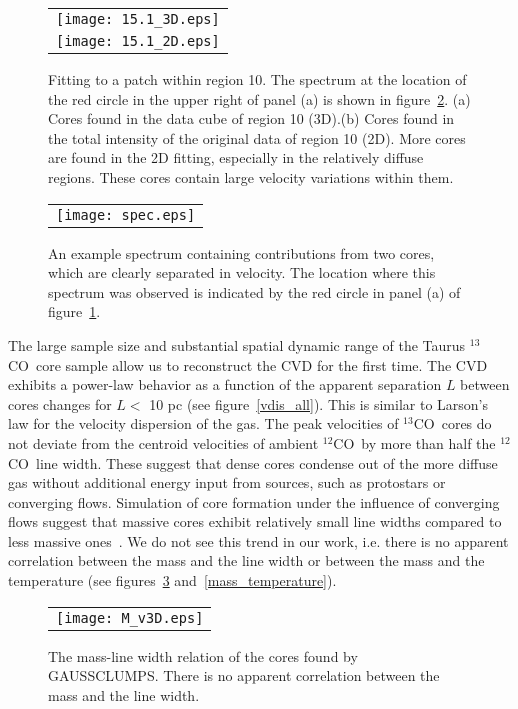 \documentclass[12pt,preprint]{aastex}
\def\co{$^{12}$CO}
\def\13co{$^{13}$CO}
\begin{document}
\begin{figure}
\begin{tabular}{c}
\texttt{[image: 15.1\_3D.eps]}\\
\texttt{[image: 15.1\_2D.eps]}\\
\end{tabular}
\caption{Fitting to a patch within region 10. The spectrum at the location of the red circle in the upper right of panel (a) is shown in figure~\ref{overlap}. (a) Cores found in the data cube of region 10 (3D).(b) Cores found in the total intensity of the original data of region 10 (2D).
More cores are found in the 2D fitting, especially in the relatively diffuse regions. These cores contain large velocity variations within them. \label{region10}}
\end{figure}

\begin{figure}
\begin{tabular}{c}
\texttt{[image: spec.eps]}\\
\end{tabular}
\caption{An example spectrum containing contributions from two cores, which are clearly separated in velocity. The location where this spectrum was observed is indicated by the red circle in panel (a) of figure~\ref{region10}. \label{overlap}}
\end{figure}

The large sample size and substantial spatial dynamic range of the Taurus \13co\ core sample allow us
to reconstruct the CVD for the first time. The CVD exhibits a power-law behavior as a function of the apparent separation $L$  between cores changes for $L<$ 10 pc (see figure~\ref{vdis_all}). This is similar to Larson's law for the velocity dispersion of the gas. The
peak velocities of \13co\ cores do not deviate from the centroid
velocities of ambient \co\ by more than half the \co\ line width. These
suggest that dense cores condense out of the more
diffuse gas without additional energy input from sources, such as protostars or
converging flows. Simulation of core formation under the influence of converging flows suggest that massive cores exhibit relatively small line widths compared to less massive ones~\citep{Gong2011}.
We do not see this trend in our work, i.e. there is no apparent correlation between the mass and the line width or
between the mass and the temperature (see figures~\ref{mass_velocity} and~\ref{mass_temperature}).

\begin{figure}[htb]
\centering
\begin{tabular}{c}
\texttt{[image: M\_v3D.eps]}\\
\end{tabular}
\caption{ The mass-line width relation of the cores found by GAUSSCLUMPS. There is no apparent correlation between the mass and the line width.
\label{mass_velocity}}
\end{figure}
\end{document}
